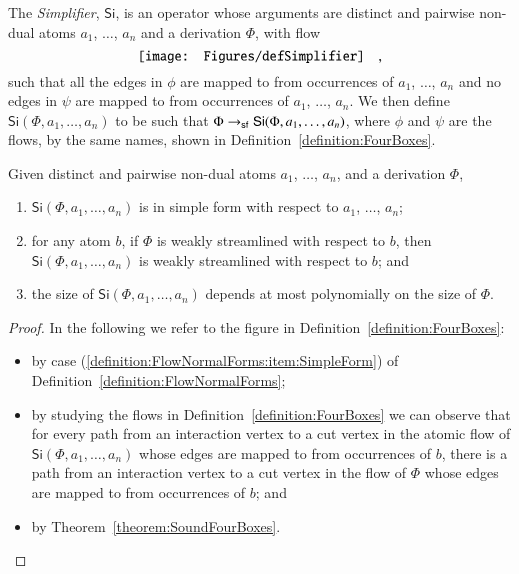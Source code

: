 
\newcommand{\Simpl}{\mathsf{Si}}
\begin{definition}\label{definition:Simplifier}
The \emph{Simplifier}, $\Simpl$, is an operator whose arguments are distinct and pairwise non-dual atoms $a_1$, $\dots$, $a_n$ and a derivation $\Phi$, with flow
\[
\vcenter{\hbox{\texttt{[image: Figures/defSimplifier]}}}
\quad,
\]
such that all the edges in $\phi$ are mapped to from occurrences of $a_1$, $\dots$, $a_n$ and no edges in $\psi$ are mapped to from occurrences of $a_1$, $\dots$, $a_n$.
We then define $\Simpl(\Phi,a_1,\dots,a_n)$ to be such that $\Phi\to_\frfb\Simpl(\Phi,a_1,\dots,a_n)$, where $\phi$ and $\psi$ are the flows, by the same names, shown in Definition~\vref{definition:FourBoxes}.
\end{definition}

\begin{proposition}\label{proposition:Simplifier}
Given distinct and pairwise non-dual atoms $a_1$, $\dots$, $a_n$, and a derivation $\Phi$,
\begin{enumerate}
\item $\Simpl(\Phi,a_1,\dots,a_n)$ is in simple form with respect to $a_1$, $\dots$, $a_n$;
\item for any atom $b$, if\/ $\Phi$ is weakly streamlined with respect to $b$, then\/ $\Simpl(\Phi,a_1,\dots,a_n)$ is weakly streamlined with respect to $b$; and
\item the size of\/ $\Simpl(\Phi,a_1,\dots,a_n)$ depends at most polynomially on the size of\/ $\Phi$.
\end{enumerate}
\end{proposition}

\begin{proof}
In the following we refer to the figure in Definition~\vref{definition:FourBoxes}:
\begin{itemize}
\item by case (\ref{definition:FlowNormalForms:item:SimpleForm}) of Definition~\vref{definition:FlowNormalForms};
\item by studying the flows in Definition~\ref{definition:FourBoxes} we can observe that for every path from an interaction vertex to a cut vertex in the atomic flow of $\Simpl(\Phi,a_1,\dots,a_n)$ whose edges are mapped to from occurrences of $b$, there is a path from an interaction vertex to a cut vertex in the flow of $\Phi$ whose edges are mapped to from occurrences of $b$; and
\item by Theorem~\vref{theorem:SoundFourBoxes}.
\end{itemize}
\end{proof}
